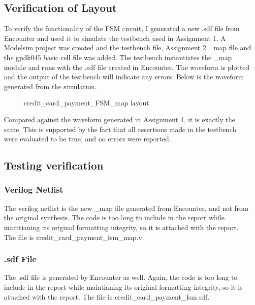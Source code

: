 \documentclass[12pt]{article}
\begin{document}
\subsection{Verification of Layout} %
To verify the functionality of the FSM circuit, I generated a new .sdf file from Encounter and used it to simulate the testbench used in Assignment 1. A Modelsim project was created and the testbench file, Assignment 2 \_map file and the gpdk045 basic cell file was added. The testbench instantiates the \_map module and runs with the .sdf file created in Encounter. The waveform is plotted and the output of the testbench will indicate any errors. Below is the waveform generated from the simulation.
\begin{figure} [H]
    \centering
    \caption{credit\_card\_payment\_FSM\_map layout}
\end{figure}
Compared against the waveform generated in Assignment 1, it is exactly the same. This is supported by the fact that all assertions made in the testbench were evaluated to be true, and no errors were reported.

\subsection{Testing verification}
\subsubsection{Verilog Netlist}
The verilog netlist is the new \_map file generated from Encounter, and not from the original synthesis. The code is too long to include in the report while maintianing its original formatting integrity, so it is attached with the report. The file is credit\_card\_payment\_fsm\_map.v.

\subsubsection{.sdf File} %
The .sdf file is generated by Encounter as well. Again, the code is too long to include in the report while maintianing its original formatting integrity, so it is attached with the report. The file is credit\_card\_payment\_fsm.sdf.
\end{document}
